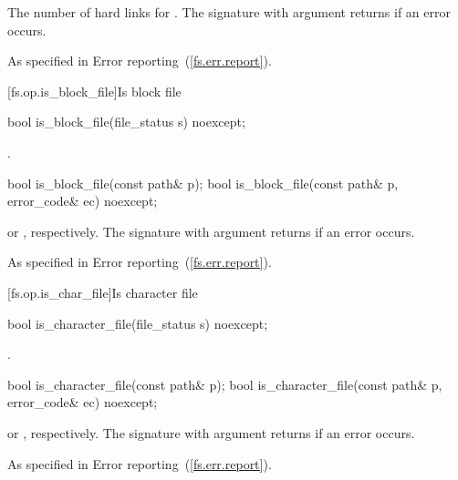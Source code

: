 \begin{itemdescr}
\pnum
\returns The number of hard links for . The signature
  with argument  returns 
  if an error occurs.

\pnum
\throws As specified in Error reporting~(\ref{fs.err.report}).
\end{itemdescr}


[fs.op.is_block_file]{Is block file}

%
\begin{itemdecl}
bool is_block_file(file_status s) noexcept;
\end{itemdecl}

\begin{itemdescr}
\pnum
\returns {}.
\end{itemdescr}

%
\begin{itemdecl}
bool is_block_file(const path& p);
bool is_block_file(const path& p, error_code& ec) noexcept;
\end{itemdecl}

\begin{itemdescr}
\pnum
\returns {} or , respectively.
The signature with argument  returns  if an error occurs.

\pnum
\throws As specified in Error reporting~(\ref{fs.err.report}).
\end{itemdescr}


[fs.op.is_char_file]{Is character file}

%
\begin{itemdecl}
bool is_character_file(file_status s) noexcept;
\end{itemdecl}

\begin{itemdescr}
\pnum
\returns {}.
\end{itemdescr}

%
\begin{itemdecl}
bool is_character_file(const path& p);
bool is_character_file(const path& p, error_code& ec) noexcept;
\end{itemdecl}

\begin{itemdescr}
\pnum
\returns {}
  or ,
  respectively. The signature with argument  returns 
  if an error occurs.

\pnum
\throws As specified in Error reporting~(\ref{fs.err.report}).
\end{itemdescr}


